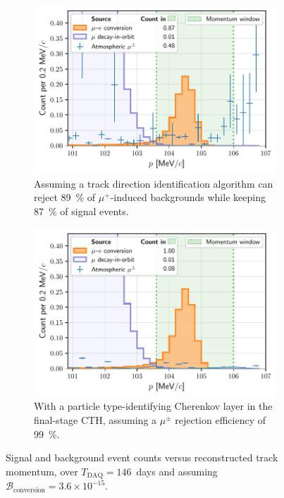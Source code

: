 \begin{figure}
    \centering
    \begin{subfigure}{0.48\textwidth}
        \centering
        \includegraphics[width=\textwidth]{chapter6/thesis_conversion_search_momentum_distribution_withcuts_with_mu+_ID_dp=0.1_v3.pdf}
        \caption{Assuming a track direction identification algorithm can reject
        \SI{89}{\percent} of $\mu^+$-induced backgrounds while keeping
        \SI{87}{\percent} of signal events.}
        \label{fig:spectrum_with_direction_id}
    \end{subfigure}
    \hfill
    \begin{subfigure}{0.48\textwidth}
        \centering
        \includegraphics[width=\textwidth]{chapter6/thesis_conversion_search_momentum_distribution_withcuts_with_mu+-.pdf}
        \caption{With a particle type-identifying Cherenkov layer in the
        final-stage CTH, assuming a $\mu^{\pm}$ rejection efficiency of
        \SI{99}{\percent}.}
        \label{fig:spectrum_with_cherenkov_pid}
    \end{subfigure}
        
    \caption{Signal and background event counts versus reconstructed track
    momentum, over $T_\mathrm{DAQ}=146$~days and assuming
    $\mathcal{B}_\mathrm{conversion} = 3.6\times 10^{-15}$. }
    \label{fig:lin_spectra}
\end{figure}


